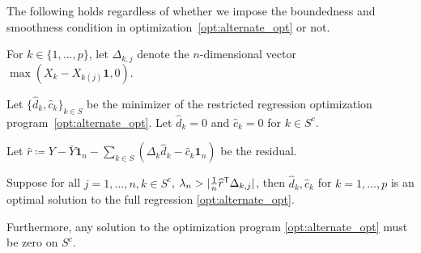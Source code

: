 \begin{theorem} 
The following holds regardless of whether we impose the boundedness and smoothness condition in optimization~\ref{opt:alternate_opt} or not.

For $k \in \{1,...,p\}$, let $\Delta_{k, j}$ denote the $n$-dimensional vector $\max( X_k - X_{k (j)} \mathbf{1}, 0)$. 

Let $\{\hat{d}_k, \hat{c}_k \}_{k \in S}$ be the minimizer of the restricted regression optimization program~\ref{opt:alternate_opt}. 
Let $\hat{d}_k = 0$ and $ \hat{c}_k = 0$ for $k \in S^c$.

Let $\hat{r} \coloneqq Y - \bar{Y} \mathbf{1}_n - \sum_{k \in S} (\Delta_k \hat{d}_k - \hat{c}_k \mathbf{1}_n) $ be the residual.

Suppose for all $j=1,...,n, k\in S^c$, $\lambda_n > | \frac{1}{n} \widehat{r}^{\mathsf{T}} \Delta_{k,j}|$, then $\hat{d}_k, \hat{c}_k$ for $k=1,...,p$ is an optimal solution to the full regression \ref{opt:alternate_opt}.

Furthermore, any solution to the optimization program \ref{opt:alternate_opt} must be zero on $S^c$.
\end{theorem}

